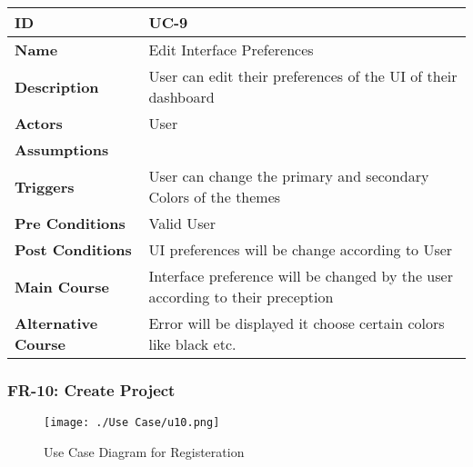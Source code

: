     \begin{center}
        \begin{tabularx}{\textwidth}{|l|X|}
            \hline
            \textbf{ID} & UC-9 \\
            \hline
            \textbf{Name} & Edit Interface Preferences \\
            \hline
            \textbf{Description} & User can edit their preferences of the UI of their dashboard \\
            \hline
            \textbf{Actors} & User \\
            \hline
            \textbf{Assumptions} &  \\
            \hline
            \textbf{Triggers} & User can change the primary and secondary Colors of the themes \\
            \hline
            \textbf{Pre Conditions} & Valid User \\
            \hline
            \textbf{Post Conditions} & UI preferences will be change according to User \\
            \hline
            \textbf{Main Course} & Interface preference will be changed by the user according to their preception  \\
            \hline
            \textbf{Alternative Course} & Error will be displayed it choose certain colors like black etc. \\
            \hline
            
        \end{tabularx}
    \end{center}
    \newpage
    

    \subsubsection{FR-10: Create Project}
    \begin{figure}[H]
        \texttt{[image: ./Use Case/u10.png]}
        \centering 
        \caption{Use Case Diagram for Registeration}
        \label{fig:prototype1}
        \end{figure}
        
